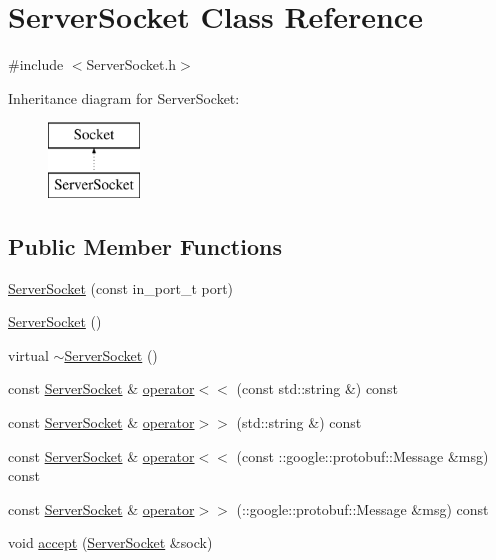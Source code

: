 \hypertarget{class_server_socket}{}\section{Server\+Socket Class Reference}
\label{class_server_socket}


{\ttfamily \#include $<$Server\+Socket.\+h$>$}

Inheritance diagram for Server\+Socket\+:\begin{figure}[H]
\begin{center}
\leavevmode
\includegraphics[height=2.000000cm]{class_server_socket}
\end{center}
\end{figure}
\subsection*{Public Member Functions}
\begin{DoxyCompactItemize}
\item 
\hyperlink{class_server_socket_a3b48c79e2e66bf8ab26b7350275b8ad0}{Server\+Socket} (const in\+\_\+port\+\_\+t port)
\item 
\hyperlink{class_server_socket_a2b3098589541243241ca25495155186c}{Server\+Socket} ()
\item 
virtual \hyperlink{class_server_socket_a510674d924c2544e6b0069e39c36516b}{$\sim$\+Server\+Socket} ()
\item 
const \hyperlink{class_server_socket}{Server\+Socket} \& \hyperlink{class_server_socket_ab5fe4b2d92d7014f7663c1bbacbbeda5}{operator$<$$<$} (const std\+::string \&) const 
\item 
const \hyperlink{class_server_socket}{Server\+Socket} \& \hyperlink{class_server_socket_a6bfabf01766bdb2c7f53274d8d771212}{operator$>$$>$} (std\+::string \&) const 
\item 
const \hyperlink{class_server_socket}{Server\+Socket} \& \hyperlink{class_server_socket_a184d1eff33380dd9708505429bfcbfb5}{operator$<$$<$} (const \+::google\+::protobuf\+::\+Message \&msg) const 
\item 
const \hyperlink{class_server_socket}{Server\+Socket} \& \hyperlink{class_server_socket_a5ff4a820f96e1a9dd5fa234ba3946f83}{operator$>$$>$} (\+::google\+::protobuf\+::\+Message \&msg) const 
\item 
void \hyperlink{class_server_socket_a5f718be4b14e22d7f6e3dd9793ff85a2}{accept} (\hyperlink{class_server_socket}{Server\+Socket} \&sock)
\end{DoxyCompactItemize}



